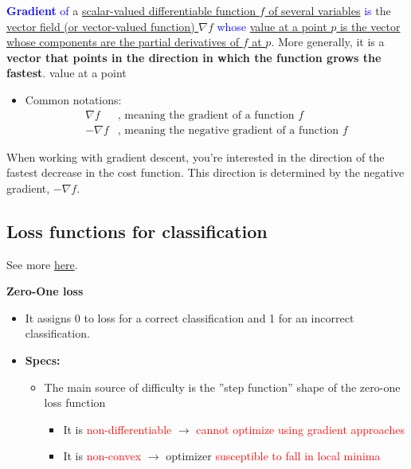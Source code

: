 \documentclass[12pt, a4paper]{article}
\begin{document}
\textcolor{blue}{\textbf{Gradient}} \textcolor{blue}{of} a \uline{scalar-valued differentiable function $f$ of several variables} \textcolor{blue}{is} the \uline{vector field (or vector-valued function) $\nabla f$} \textcolor{blue}{whose} \uline{value at a point $p$ is the vector whose components are the partial derivatives of $f$ at $p$}. More generally, it is a \textbf{vector that points in the direction in which the function grows the fastest}. value at a point

\begin{itemize}
  \item Common notations:
  \begin{align*}
    \nabla f & \text{, meaning the gradient of a function $f$} \\
    -\nabla f & \text{, meaning the negative gradient of a function $f$}
  \end{align*}
\end{itemize}

When working with gradient descent, you’re interested in the direction of the fastest decrease in the cost function. This direction is determined by the negative gradient, $-\nabla f$.



\subsection{Loss functions for classification}\label{loss-functions-for-classification}

See more \href{https://en.wikipedia.org/wiki/Loss_functions_for_classification}{here}.

\textbf{Zero-One loss}
\begin{itemize}
  \item It assigns 0 to loss for a correct classification and 1 for an incorrect classification.
  \item \textbf{Specs:}
  \begin{itemize}
    \item The main source of difficulty is the ”step function” shape of the zero-one loss function
    \begin{itemize}
      \item It is \textcolor{red}{non-differentiable} $\rightarrow$ \textcolor{red}{cannot optimize using gradient approaches}
      \item It is \textcolor{red}{non-convex} $\rightarrow$ optimizer \textcolor{red}{susceptible to fall in local minima}
    \end{itemize}
  \end{itemize}
\end{itemize}
\end{document}
